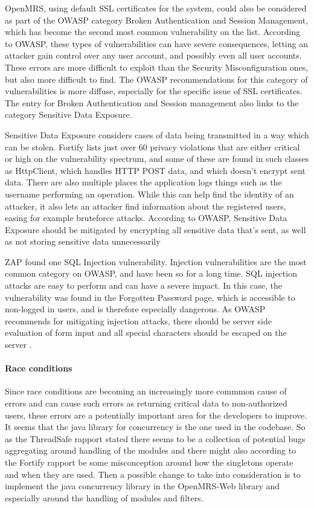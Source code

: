 \documentclass{report} %
\begin{document}
OpenMRS, using default SSL certificates for the system, could also be considered
as part of the OWASP category Broken Authentication and Session Management,
which has become the second most common vulnerability on the list. According to
OWASP, these types of vulnerabilities can have severe consequences, letting an
attacker gain control over any user account, and possibly even all user accounts.
These errors are more difficult to exploit than the Security Misconfiguration
ones, but also more difficult to find. The OWASP recommendations for this
category of vulnerabilities is more diffuse, especially for the specific issue
of SSL certificates. The entry for Broken Authentication and Session management
also links to the category Sensitive Data Exposure.

Sensitive Data Exposure considers cases of data being transmitted in a way which
can be stolen. Fortify lists just over 60 privacy violations that are either critical
or high on the vulnerability spectrum, and some of these are found in such
classes as HttpClient, which handles HTTP POST data, and which doesn't encrypt sent
data. There are also multiple places the application logs things such as the
username performing an operation. While this can help find the identity of
an attacker, it also lets an attacker find information about the registered
users, easing for example bruteforce attacks.
According to OWASP, Sensitive Data Exposure should be mitigated by encrypting
all sensitive data that's sent, as well as not storing sensitive data
unnecessarily

ZAP found one SQL Injection vulnerability. Injection vulnerabilities are the
most common category on OWASP, and have been so for a long time. SQL injection
attacks are easy to perform and can have a severe impact. In this case, the
vulnerability was found in the Forgotten Password page, which is accessible to
non-logged in users, and is therefore especially dangerous. As OWASP recommends
for mitigating injection attacks, there should be server side evaluation of form
input and all special characters should be escaped on the server \autocite[]{owasptop10}.


\paragraph{Race conditions}
Since race conditions are becoming an increasingly
more commmon cause of errors and can cause such errors as returning critical
data to non-authorized users, these errors are a potentially important area for
the developers to improve. It seems that the java library for concurrency is the
one used in the codebase. So as the ThreadSafe rapport stated there seems to be
a collection of potential bugs aggregating around handling of the modules and
there might also according to the Fortify rapport be some misconception around
how the singletons operate and when they are used. Then a possible change to take
into consideration is to implement the java concurrency library in the
OpenMRS-Web library and especially around the handling of modules and filters. 
\end{document}
